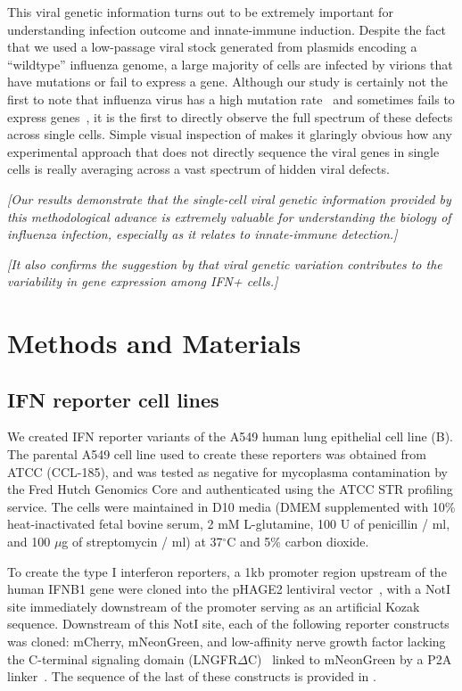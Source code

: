 \documentclass[9pt,lineno]{elife}
\newcommand{\jdbcomment}[1]{\emph{\color{red} [#1]}}
\begin{document}
This viral genetic information turns out to be extremely important for understanding infection outcome and innate-immune induction.
Despite the fact that we used a low-passage viral stock generated from plasmids encoding a ``wildtype'' influenza genome, a large majority of cells are infected by virions that have mutations or fail to express a gene.
Although our study is certainly not the first to note that influenza virus has a high mutation rate~\citep{parvin1986measurement, suarez1992heterogeneity, suarez1994estimation, bloom2014experimentally, pauly2017novel} and sometimes fails to express genes~\citep{brooke2013most, heldt2015single, dou2017analysis, russell2018extreme}, it is the first to directly observe the full spectrum of these defects across single cells.
Simple visual inspection of  makes it glaringly obvious how any experimental approach that does not directly sequence the viral genes in single cells is really averaging across a vast spectrum of hidden viral defects.


\jdbcomment{Our results demonstrate that the single-cell viral genetic information provided by this methodological advance is extremely valuable for understanding the biology of influenza infection, especially as it relates to innate-immune detection.}

\jdbcomment{It also confirms the suggestion by \citet{sjaastad2018distinct} that viral genetic variation contributes to the variability in gene expression among IFN+ cells.}

\section{Methods and Materials}

\subsection{IFN reporter cell lines}
We created IFN reporter variants of the A549 human lung epithelial cell line (B).
The parental A549 cell line used to create these reporters was obtained from ATCC (CCL-185), and was tested as negative for mycoplasma contamination by the Fred Hutch Genomics Core and authenticated using the ATCC STR profiling service.
The cells were maintained in D10 media (DMEM supplemented with 10\% heat-inactivated fetal bovine serum, 2 mM L-glutamine, 100 U of penicillin / ml, and 100 $\mu$g of streptomycin / ml) at 37$^{\circ}$C and 5\% carbon dioxide.

To create the type I interferon reporters, a 1kb promoter region upstream of the human IFNB1 gene were cloned into the pHAGE2 lentiviral vector~\citep{oconnell2010lentiviral}, with a NotI site immediately downstream of the promoter serving as an artificial Kozak sequence. 
Downstream of this NotI site, each of the following reporter constructs was cloned: mCherry, mNeonGreen, and low-affinity nerve growth factor lacking the C-terminal signaling domain (LNGFR$\Delta$C)~\citep{bonini1997hsv,ruggieri1997cell} linked to mNeonGreen by a P2A linker~\citep{kim2011high}.
The sequence of the last of these constructs is provided in .
\end{document}
